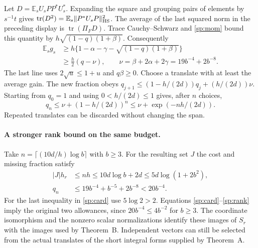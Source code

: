 Let $D=\mathbb E_s U_sPP^*U_s^*$. Expanding the square and grouping
pairs of elements by $s^{-1}t$ gives
$\operatorname{tr}(D^2)=\mathbb E_s\|P^*U_sP\|_{\rm HS}^2$.
The average of the last squared norm in the preceding display is
$\operatorname{tr}(\Pi_FD)$. Trace Cauchy--Schwarz and \eqref{sp:mom}
bound this quantity by $h\sqrt{(1-q)(1+\beta)}$. Consequently
\begin{align}
 \mathbb E_s g_s
  &\ge h\{1-\alpha-\gamma-\sqrt{(1-q)(1+\beta)}\}\label{sp:exactgrowth}\\
  &\ge \tfrac h2(q-\nu),\qquad
    \nu=\beta+2\alpha+2\gamma=19b^{-4}+2b^{-8}.\nonumber
\end{align}
The last line uses $2\sqrt u\le1+u$ and $q\beta\ge0$.
Choose a translate with at least the average gain. The new fraction obeys
$q_{j+1}\le(1-h/(2d))q_j+(h/(2d))\nu$. Starting from $q_0=1$
and using $0<h/(2d)\le1$ gives, after $n$ choices,
\begin{equation}
 q_n\le\nu+(1-h/(2d))^n\le\nu+\exp(-nh/(2d)).
 \label{sp:decay}
\end{equation}
Repeated translates can be discarded without changing the span.

\paragraph{A stronger rank bound on the same budget.}
Take $n=\lceil(10d/h)\log b\rceil$ with $b\ge3$. For the resulting
set $J$ the cost and missing fraction satisfy
\begin{align}
 |J|h_r &\le nh\le 10d\log b+2d\le5d\log(1+2b^2),
   \label{sp:card}\\
 q_n&\le 19b^{-4}+b^{-5}+2b^{-8}<20b^{-4}.
   \label{sp:rank}
\end{align}
For the last inequality in \eqref{sp:card} use $5\log 2>2$.
Equations \eqref{sp:card}--\eqref{sp:rank} imply the original two
allowances, since $20b^{-4}\le4b^{-2}$ for $b\ge3$.
The coordinate isomorphism and the nonzero scalar normalizations identify
these images of $S_r$ with the images used by Theorem~B. Independent
vectors can still be selected from the actual translates of the short
integral forms supplied by Theorem~A.

